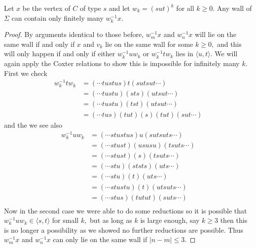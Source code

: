 \documentclass[class=book, crop=false]{standalone}
\begin{document}
\begin{lemma}
	\label{336f2finitewalls}
	Let $x$ be the vertex of $C$ of type $s$ and let $w_k=(sut)^k$ for all $k\ge 0.$ Any wall of $\Sigma$ can contain only finitely many $w_k^{-1}x.$
\end{lemma}
\begin{proof}
	By arguments identical to those before, $w_m^{-1}x$ and $w_{n}^{-1}x$ will lie on the same wall if and only if $x$ and $v_k$ lie on the same wall for some $k\ge 0,$ and this will only happen if and only if either $w_k^{-1}uw_k$ or $w_k^{-1}tw_k$ lies in $\langle u,t\rangle.$ We will again apply the Coxter relations to show this is impossible for infinitely many $k.$ First we check
\begin{align*}
	w_k^{-1}tw_k&=(\cdots tustus)t(sutsut\cdots)\\
		    &=(\cdots tustu)(sts)(utsut\cdots)\\
		    &=(\cdots tustu)(tst)(utsut\cdots)\\
		    &=(\cdots tus)(tut)(s)(tut)(sut\cdots)
\end{align*}
and the we see also
\begin{align*}
	w_k^{-1}uw_k&=(\cdots stustus)u(sutsuts\cdots)\\
		    &=(\cdots stust)(ususu)(tsuts\cdots)\\
		    &=(\cdots stust)(s)(tsuts\cdots)\\
		    &=(\cdots stu)(ststs)(uts\cdots)\\
		    &=(\cdots stu)(t)(uts\cdots)\\
		    &=(\cdots stustu)(t)(utsuts\cdots)\\
		    &=(\cdots stus)(tutut)(suts\cdots)\\
\end{align*}
Now in the second case we were able to do some reductions so it is possible that $w_{k}^{-1}uw_k\in \langle s,t \rangle$ for small $k,$ but as long as $k$ is large enough, say $k\ge 3$ then this is no longer a possibility as we showed no further reductions are possible. Thus $w_m^{-1}x$ and $w_n^{-1}x$ can only lie on the same wall if $|n-m|\le 3.$

\end{proof}
\end{document}
